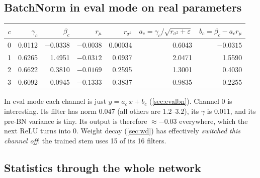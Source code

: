 \subsection{BatchNorm in eval mode on real parameters}

\begin{repo}
\begin{center}
\small
\begin{tabular}{@{}crrrrrr@{}}
\toprule
$c$ & $\gamma_c$ & $\beta_c$ & $r_\mu$ & $r_{\sigma^2}$ & $a_c=\gamma_c/\sqrt{r_{\sigma^2}+\varepsilon}$ & $b_c=\beta_c-a_c r_\mu$\\
\midrule
0 & 0.0112 & $-0.0338$ & $-0.0038$ & 0.00034 & 0.6043 & $-0.0315$\\
1 & 0.6265 & 1.4951 & $-0.0312$ & 0.0937 & 2.0471 & 1.5590\\
2 & 0.6622 & 0.3810 & $-0.0169$ & 0.2595 & 1.3001 & 0.4030\\
3 & 0.6092 & 0.0945 & $-0.1333$ & 0.3837 & 0.9835 & 0.2255\\
\bottomrule
\end{tabular}
\end{center}
In eval mode each channel is just $y=a_c\,x+b_c$ (\cref{sec:evalbn}). Channel 0 is interesting. Its filter has norm $0.047$ (all others are $1.2$--$3.2$), its $\gamma$ is $0.011$, and its pre-BN variance is tiny. Its output is therefore $\approx -0.03$ everywhere, which the next ReLU turns into 0. Weight decay (\cref{sec:wd}) has effectively \emph{switched this channel off}: the trained stem uses 15 of its 16 filters.
\end{repo}

\subsection{Statistics through the whole network}

